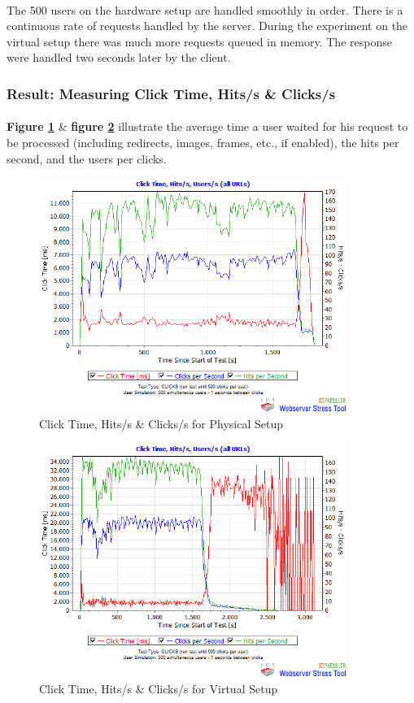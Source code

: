 \paragraph{}
The 500 users on the hardware setup are handled smoothly in order. There is a continuous rate of requests handled by the server. During the experiment on the virtual setup there was much more requests queued in memory. The response were handled two seconds later by the client.

\subsubsection{Result: Measuring Click Time, Hits/s \& Clicks/s}
\paragraph{}

\textbf{Figure \ref{fig:resP3hw}} \& \textbf{figure \ref{fig:resP3vm}} illustrate the average time a user waited for his request to be processed (including redirects, images, frames, etc., if enabled), the hits per second, and the users per clicks. 

 \begin{figure}[H]
    \centering
    \includegraphics[width=10cm]{Pictures/ph2.png}
    \caption{Click Time, Hits/s \& Clicks/s for Physical Setup}
    \label{fig:resP3hw}
\end{figure}
   
 
\begin{figure}[H]
    \centering
    \includegraphics[width=10cm]{Pictures/vm2.png}
    \caption{Click Time, Hits/s \& Clicks/s for Virtual Setup}
    \label{fig:resP3vm}
\end{figure} 


